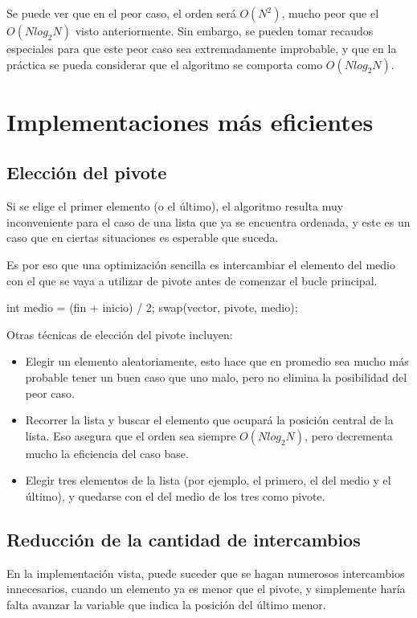 Se puede ver que en el peor caso, el orden será $O(N^2)$, mucho peor que el
$O(Nlog_2N)$ visto anteriormente.  Sin embargo, se pueden tomar recaudos
especiales para que este peor caso sea extremadamente improbable, y que en
la práctica se pueda considerar que el algoritmo se comporta como
$O(Nlog_2N)$.

\section{Implementaciones más eficientes}

\subsection{Elección del pivote}

Si se elige el primer elemento (o el último), el algoritmo resulta muy
inconveniente para el caso de una lista que ya se encuentra ordenada, y
este es un caso que en ciertas situaciones es esperable que suceda.

Es por eso que una optimización sencilla es intercambiar el elemento del
medio con el que se vaya a utilizar de pivote antes de comenzar el bucle
principal.

\begin{codigo-c}
    int medio = (fin + inicio) / 2;
    swap(vector, pivote, medio);
\end{codigo-c}

Otras técnicas de elección del pivote incluyen:
\begin{itemize}
\item Elegir un elemento aleatoriamente, esto hace que en promedio sea
mucho más probable tener un buen caso que uno malo, pero no elimina la
posibilidad del peor caso.
\item Recorrer la lista y buscar el elemento que ocupará la posición
central de la lista.  Eso asegura que el orden sea siempre $O(Nlog_2N)$, pero
decrementa mucho la eficiencia del caso base.
\item Elegir tres elementos de la lista (por ejemplo, el primero, el del
medio y el último), y quedarse con el del medio de los tres como pivote.
\end{itemize}

\subsection{Reducción de la cantidad de intercambios}

En la implementación vista, puede suceder que se hagan numerosos
intercambios innecesarios, cuando un elemento ya es menor que el pivote, y
simplemente haría falta avanzar la variable que indica la posición del
último menor.

